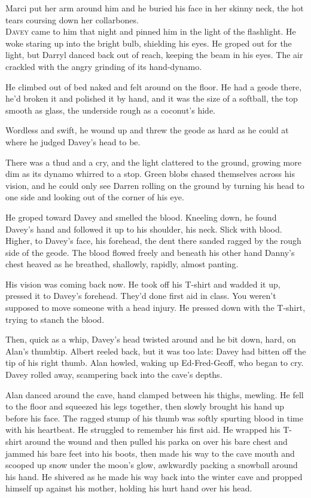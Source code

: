 \documentclass{article}
\begin{document}
Marci put her arm around him and he buried his face in her skinny
neck, the hot tears coursing down her collarbones.
\\
\lettrine[lines=3, lhang=.5, nindent=0pt, findent=2pt]{D}{avey} came to him that night and pinned him in the light of the
flashlight.  He woke staring up into the bright bulb, shielding his
eyes.  He groped out for the light, but Darryl danced back out of
reach, keeping the beam in his eyes.  The air crackled with the angry
grinding of its hand-dynamo.

He climbed out of bed naked and felt around on the floor.  He had a
geode there, he'd broken it and polished it by hand, and it was the
size of a softball, the top smooth as glass, the underside rough as a
coconut's hide.

Wordless and swift, he wound up and threw the geode as hard as he
could at where he judged Davey's head to be.

There was a thud and a cry, and the light clattered to the ground,
growing more dim as its dynamo whirred to a stop.  Green blobs chased
themselves across his vision, and he could only see Darren rolling on
the ground by turning his head to one side and looking out of the
corner of his eye.

He groped toward Davey and smelled the blood.  Kneeling down, he found
Davey's hand and followed it up to his shoulder, his neck.  Slick with
blood.  Higher, to Davey's face, his forehead, the dent there sanded
ragged by the rough side of the geode.  The blood flowed freely and
beneath his other hand Danny's chest heaved as he breathed, shallowly,
rapidly, almost panting.

His vision was coming back now.  He took off his T-shirt and wadded it
up, pressed it to Davey's forehead.  They'd done first aid in class. 
You weren't supposed to move someone with a head injury.  He pressed
down with the T-shirt, trying to stanch the blood.

Then, quick as a whip, Davey's head twisted around and he bit down,
hard, on Alan's thumbtip.  Albert reeled back, but it was too late: 
Davey had bitten off the tip of his right thumb.  Alan howled, waking
up Ed-Fred-Geoff, who began to cry.  Davey rolled away, scampering
back into the cave's depths.

Alan danced around the cave, hand clamped between his thighs, mewling. 
He fell to the floor and squeezed his legs together, then slowly
brought his hand up before his face.  The ragged stump of his thumb
was softly spurting blood in time with his heartbeat.  He struggled to
remember his first aid.  He wrapped his T-shirt around the wound and
then pulled his parka on over his bare chest and jammed his bare feet
into his boots, then made his way to the cave mouth and scooped up
snow under the moon's glow, awkwardly packing a snowball around his
hand.  He shivered as he made his way back into the winter cave and
propped himself up against his mother, holding his hurt hand over his
head.
\end{document}
